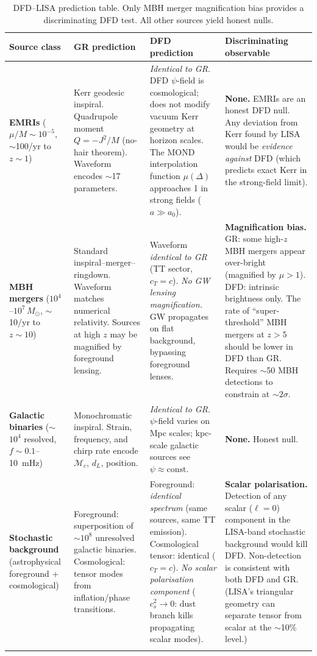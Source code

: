 \documentclass[11pt]{article}
\theoremstyle{definition}
\theoremstyle{remark}
\newcommand{\Msun}{M_\odot}
\begin{document}
\begin{longtable}{@{}p{2.5cm}p{3cm}p{3cm}p{4cm}@{}}
\toprule
\textbf{Source class} & \textbf{GR prediction} & \textbf{DFD prediction} &
\textbf{Discriminating observable} \\
\midrule
\endhead

\textbf{EMRIs}
($\mu/M \sim 10^{-5}$,
$\sim$100/yr to $z \sim 1$)
& Kerr geodesic inspiral.
Quadrupole moment $Q = -J^2/M$
(no-hair theorem). Waveform
encodes $\sim$17 parameters.
& \emph{Identical to GR.}
DFD $\psi$-field is cosmological;
does not modify vacuum Kerr
geometry at horizon scales.
The MOND interpolation function
$\mu(\Delta)$ approaches 1 in
strong fields ($a \gg a_0$).
& \textbf{None.} EMRIs are an honest
DFD null. Any deviation from Kerr
found by LISA would be \emph{evidence
against} DFD (which predicts exact
Kerr in the strong-field limit). \\
\midrule

\textbf{MBH mergers}
($10^4$--$10^7\,\Msun$,
$\sim$10/yr to $z \sim 10$)
& Standard inspiral--merger--ringdown.
Waveform matches numerical relativity.
Sources at high $z$ may be
magnified by foreground lensing.
& Waveform \emph{identical to GR}
(TT sector, $c_T = c$).
\emph{No GW lensing magnification.}
GW propagates on flat background,
bypassing foreground lenses.
& \textbf{Magnification bias.}
GR: some high-$z$ MBH mergers appear
over-bright (magnified by $\mu > 1$).
DFD: intrinsic brightness only.
The rate of ``super-threshold'' MBH
mergers at $z > 5$ should be lower
in DFD than GR. Requires $\sim$50
MBH detections to constrain at
$\sim$$2\sigma$.
\\
\midrule

\textbf{Galactic binaries}
($\sim$$10^4$ resolved,
$f \sim 0.1$--10~mHz)
& Monochromatic inspiral.
Strain, frequency, and chirp
rate encode $\mathcal{M}_c$, $d_L$,
position.
& \emph{Identical to GR.}
$\psi$-field varies on Mpc scales;
kpc-scale galactic sources see
$\psi \approx \mathrm{const}$.
& \textbf{None.} Honest null. \\
\midrule

\textbf{Stochastic background}
(astrophysical foreground
+ cosmological)
& Foreground: superposition of
$\sim$$10^8$ unresolved galactic
binaries. Cosmological: tensor
modes from inflation/phase
transitions.
& Foreground: \emph{identical spectrum}
(same sources, same TT emission).
Cosmological tensor: identical
($c_T = c$).
\emph{No scalar polarisation
component} ($c_s^2 \to 0$:
dust branch kills propagating
scalar modes).
& \textbf{Scalar polarisation.}
Detection of any scalar
($\ell = 0$) component in the
LISA-band stochastic background
would kill DFD. Non-detection
is consistent with both DFD and
GR. (LISA's triangular geometry
can separate tensor from scalar
at the $\sim$10\% level.) \\
\bottomrule
\caption{DFD--LISA prediction table. Only MBH merger magnification bias
provides a discriminating DFD test. All other sources yield honest nulls.}
\label{tab:LISA-DFD}
\end{longtable}
\end{document}
